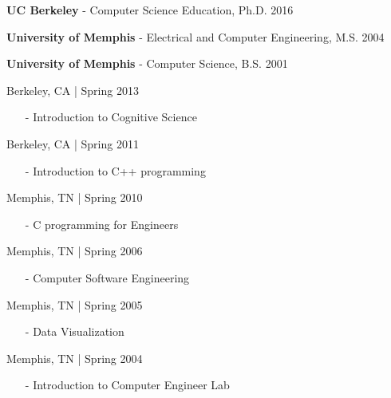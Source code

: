 \documentclass[11pt,article,oneside]{memoir}
\begin{document}
\ind \textbf{UC Berkeley} - Computer Science Education, Ph.D. \hfill 2016

\ind \textbf{University of Memphis} - Electrical and Computer Engineering, M.S. \hfill 2004

\ind \textbf{University of Memphis} - Computer Science, B.S. \hfill 2001

\bigskip

\medskip

 \hfill Berkeley, CA | Spring 2013
\begin{itemize}[noitemsep,nolistsep] 
\item[-] Introduction to Cognitive Science
\end{itemize} 

 \hfill Berkeley, CA | Spring 2011
\begin{itemize}[noitemsep,nolistsep] 
\item[-] Introduction to C++ programming
\end{itemize} 

 \hfill Memphis, TN | Spring 2010
\begin{itemize}[noitemsep,nolistsep]
\item[-] C programming for Engineers
\end{itemize}

 \hfill Memphis, TN | Spring 2006
\begin{itemize}[noitemsep,nolistsep]
\item[-] Computer Software Engineering
\end{itemize}

 \hfill Memphis, TN | Spring 2005
\begin{itemize}[noitemsep,nolistsep]
\item[-] Data Visualization
\end{itemize}

 \hfill Memphis, TN | Spring 2004
\begin{itemize}[noitemsep,nolistsep]
\item[-] Introduction to Computer Engineer Lab
\end{itemize}
\end{document}
